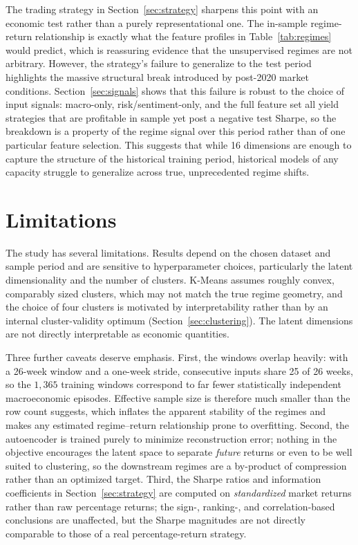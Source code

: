 \documentclass[conference]{IEEEtran}
\begin{document}
The trading strategy in Section~\ref{sec:strategy} sharpens this point with an
economic test rather than a purely representational one. The in-sample
regime-return relationship is exactly what the feature profiles in
Table~\ref{tab:regimes} would predict, which is reassuring evidence that the
unsupervised regimes are not arbitrary. However, the strategy's failure to
generalize to the test period highlights the massive structural break introduced
by post-2020 market conditions. Section~\ref{sec:signals} shows that this failure
is robust to the choice of input signals: macro-only, risk/sentiment-only, and
the full feature set all yield strategies that are profitable in sample yet post a
negative test Sharpe, so the breakdown is a property of the regime signal over
this period rather than of one particular feature selection. This suggests that
while 16 dimensions are enough
to capture the structure of the historical training period, historical models of
any capacity struggle to generalize across true, unprecedented regime shifts.

\section{Limitations}

The study has several limitations. Results depend on the chosen dataset and
sample period and are sensitive to hyperparameter choices, particularly the
latent dimensionality and the number of clusters. K-Means assumes roughly convex,
comparably sized clusters, which may not match the true regime geometry, and the
choice of four clusters is motivated by interpretability rather than by an
internal cluster-validity optimum (Section~\ref{sec:clustering}). The latent
dimensions are not directly interpretable as economic quantities.

Three further caveats deserve emphasis. First, the windows overlap heavily: with
a 26-week window and a one-week stride, consecutive inputs share 25 of 26 weeks,
so the $1{,}365$ training windows correspond to far fewer statistically
independent macroeconomic episodes. Effective sample size is therefore much
smaller than the row count suggests, which inflates the apparent stability of the
regimes and makes any estimated regime--return relationship prone to overfitting.
Second, the autoencoder is trained purely to minimize reconstruction error;
nothing in the objective encourages the latent space to separate \emph{future}
returns or even to be well suited to clustering, so the downstream regimes are a
by-product of compression rather than an optimized target. Third, the Sharpe
ratios and information coefficients in Section~\ref{sec:strategy} are computed on
\emph{standardized} market returns rather than raw percentage returns; the
sign-, ranking-, and correlation-based conclusions are unaffected, but the Sharpe
magnitudes are not directly comparable to those of a real percentage-return
strategy.
\end{document}
